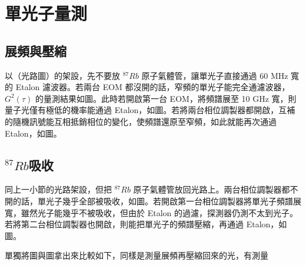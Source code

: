 \documentclass[class=NCU_thesis, crop=false]{standalone}
\begin{document}
\section{單光子量測}
\subsection{展頻與壓縮}
以（光路圖）的架設，先不要放 $^{87}Rb$ 原子氣體管，讓單光子直接通過 60 MHz 寬的 Etalon 濾波器。若兩台 EOM 都沒開的話，窄頻的單光子能完全通濾波器，$G^{2}(\tau)$ 的量測結果如圖。此時若開啟第一台 EOM，將頻譜展至 10 GHz 寬，則量子光僅有極低的機率能通過 Etalon，如圖。若將兩台相位調製器都開啟，互補的隨機訊號能互相抵銷相位的變化，使頻譜還原至窄頻，如此就能再次通過 Etalon，如圖。

\subsection{$^{87}Rb$吸收}
同上一小節的光路架設，但把 $^{87}Rb$ 原子氣體管放回光路上。兩台相位調製器都不開的話，單光子幾乎全部被吸收，如圖。若開啟第一台相位調製器將單光子頻譜展寬，雖然光子能幾乎不被吸收，但由於 Etalon 的過濾，探測器仍測不太到光子。若將第二台相位調製器也開啟，則能把單光子的頻譜壓縮，再通過 Etalon，如圖。

單獨將圖與圖拿出來比較如下，同樣是測量展頻再壓縮回來的光，有測量

\centering 
\end{document}

